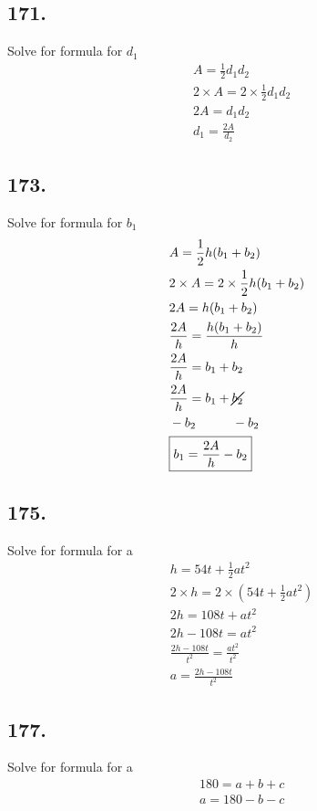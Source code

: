 \documentclass{article}
\begin{document}
    \subsection*{171.}
    Solve for formula for $d_{1}$
    \begin{align*}
        &  A = \frac{1}{2}d_{1}d_{2} \\
        & 2 \times A = 2 \times \frac{1}{2}d_{1}d_{2} \\
        &  2A = d_{1}d_{2} \\
        & \boxed{d_{1} = \frac{2A}{d_{2}}}
    \end{align*}


    \subsection*{173.}
    Solve for formula for $b_{1}$
    \begin{align*}
        &  A = \frac{1}{2}h(b_{1} + b_{2}) \\
        & 2 \times A = 2 \times \frac{1}{2}h(b_{1} + b_{2}) \\
        &  2A = h(b_{1} + b_{2}) \\
        & \frac{2A}{h} = \frac{h(b_{1} + b_{2})}{h}\\
        & \frac{2A}{h} = b_{1} + b_{2} \\
        & \frac{2A}{h} = b_{1} + \cancel{b_{2}}\\
        & - b_{2} \hspace{1cm} - b_{2} \\
        & \boxed{b_{1} = \frac{2A}{h} - b_{2}}
    \end{align*}

    \subsection*{175.}
    Solve for formula for a
    \begin{align*}
        &  h = 54t + \frac{1}{2}at^{2} \\
        & 2 \times h = 2 \times (54t + \frac{1}{2}at^{2}) \\
        & 2h = 108t + at^{2} \\
        & 2h - 108t = at^{2}\\
        & \frac{2h - 108t}{t^{2}} = \frac{at^{2}}{t^{2}}\\
        & \boxed{a = \frac{2h - 108t}{t^{2}}}
    \end{align*}

    \subsection*{177.}
    Solve for formula for a
    \begin{align*}
        &  180 = a + b + c \\
        & \boxed{a = 180 -b - c}
    \end{align*}
\end{document}
